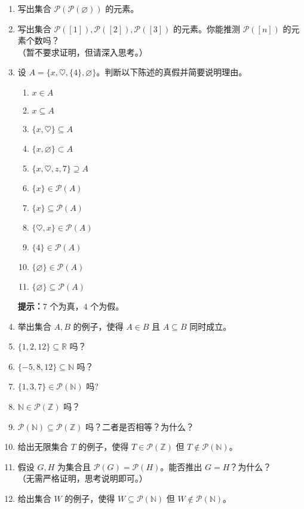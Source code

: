 \begin{enumerate}[label=(\arabic*)]
    \item 写出集合 $\mathcal{P}(\mathcal{P}(\varnothing))$ 的元素。
    \item 写出集合 $\mathcal{P}([1]), \mathcal{P}([2]), \mathcal{P}([3])$ 的元素。你能推测 $\mathcal{P}([n])$ 的元素个数吗？\\（暂不要求证明，但请深入思考。）
    \item 设 $A = \big\{x, \heartsuit, \{4\} , \varnothing\big\}$。判断以下陈述的真假并简要说明理由。
        \begin{enumerate}[label=(\alph*)]
            \item $x \in A$
            \item $x \subseteq A$
            \item $\{x, \heartsuit\} \subseteq A$
            \item $\{x, \varnothing\} \subset A$
            \item $\{x, \heartsuit, z, 7\} \supseteq A$
            \item $\{x\} \in \mathcal{P}(A)$
            \item $\{x\} \subseteq \mathcal{P}(A)$
            \item $\{\heartsuit, x\} \in \mathcal{P}(A)$
            \item $\{4\} \in \mathcal{P}(A)$
            \item $\{\varnothing\} \in \mathcal{P}(A)$
            \item $\{\varnothing\} \subseteq \mathcal{P}(A)$
        \end{enumerate}
        \textbf{提示：}$7$ 个为真，$4$ 个为假。
    \item 举出集合 $A, B$ 的例子，使得 $A \in B$ 且 $A \subseteq B$ 同时成立。
    \item $\{1, 2, 12\} \subseteq \mathbb{R}$ 吗？
    \item $\{-5, 8, 12\} \subseteq \mathbb{N}$ 吗？
    \item $\{1, 3, 7\} \in \mathcal{P}(\mathbb{N})$ 吗?
    \item $\mathbb{N} \in \mathcal{P}(\mathbb{Z})$ 吗？
    \item $\mathcal{P}(\mathbb{N}) \subseteq \mathcal{P}(\mathbb{Z})$ 吗？二者是否相等？为什么？
    \item 给出无限集合 $T$ 的例子，使得 $T \in \mathcal{P}(\mathbb{Z})$ 但 $T \notin \mathcal{P}(\mathbb{N})$。
    \item 假设 $G, H$ 为集合且 $\mathcal{P}(G) = \mathcal{P}(H)$。能否推出 $G = H$？为什么？\\（无需严格证明，思考说明即可。）
    \item 给出集合 $W$ 的例子，使得 $W \subseteq \mathcal{P}(\mathbb{N})$ 但 $W \notin \mathcal{P}(\mathbb{N})$。
\end{enumerate}
